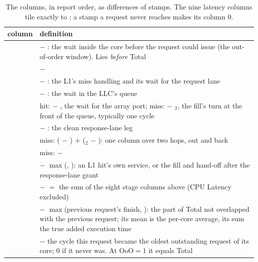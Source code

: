 \begin{table}[htbp]\centering\small
\caption{The  columns, in report order, as differences of stamps. The
nine latency columns tile exactly to ; a stamp a request never reaches makes its
column 0.}\label{tab:columns}
\begin{tabularx}{\textwidth}{@{}lY@{}}
\toprule column & definition \\ \midrule
{} &  $-$ : the wait inside the core before the request could issue (the out-of-order window). Lies \emph{before} Total \\
 &  $-$  \\
 &  $-$ : the L1's miss handling and its wait for the request lane \\
 &  $-$ : the wait in the LLC's queue \\
 & hit:  $-$ , the wait for the array port; miss:  $-$ $_2$, the fill's turn at the front of the queue, typically one cycle \\
 &  $-$ : the clean response-lane leg \\
 & miss: ( $-$ ) $+$ ($_2$ $-$ ): one column over two hops, out and back \\
 & miss:  $-$  \\
 &  $-$ $\max$(, ): an L1 hit's own service, or the fill and hand-off after the response-lane grant \\
 &  $-$  $=$ the sum of the eight stage columns above (CPU Latency excluded) \\
 &  $-$ $\max$(previous request's finish, ): the part of Total not overlapped with the previous request; its mean is the per-core average, its sum the true added execution time \\
 &  $-$ the cycle this request became the oldest outstanding request of its core; 0 if it never was. At OoO$=1$ it equals Total \\
\bottomrule
\end{tabularx}
\end{table}

